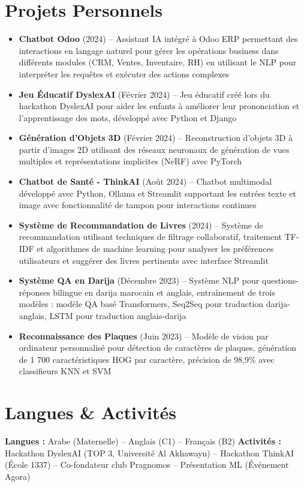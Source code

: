 \documentclass[10pt,a4paper]{article}
\begin{document}
\section*{Projets Personnels}
\begin{itemize}
    \item \textbf{Chatbot Odoo} (2024) -- Assistant IA intégré à Odoo ERP permettant des interactions en langage naturel pour gérer les opérations business dans différents modules (CRM, Ventes, Inventaire, RH) en utilisant le NLP pour interpréter les requêtes et exécuter des actions complexes
    \item \textbf{Jeu Éducatif DyslexAI} (Février 2024) -- Jeu éducatif créé lors du hackathon DyslexAI pour aider les enfants à améliorer leur prononciation et l'apprentissage des mots, développé avec Python et Django
    \item \textbf{Génération d'Objets 3D} (Février 2024) -- Reconstruction d'objets 3D à partir d'images 2D utilisant des réseaux neuronaux de génération de vues multiples et représentations implicites (NeRF) avec PyTorch
    \item \textbf{Chatbot de Santé - ThinkAI} (Août 2024) -- Chatbot multimodal développé avec Python, Ollama et Streamlit supportant les entrées texte et image avec fonctionnalité de tampon pour interactions continues
    \item \textbf{Système de Recommandation de Livres} (2024) -- Système de recommandation utilisant techniques de filtrage collaboratif, traitement TF-IDF et algorithmes de machine learning pour analyser les préférences utilisateurs et suggérer des livres pertinents avec interface Streamlit
    \item \textbf{Système QA en Darija} (Décembre 2023) -- Système NLP pour questions-réponses bilingue en darija marocain et anglais, entraînement de trois modèles : modèle QA basé Transformers, Seq2Seq pour traduction darija-anglais, LSTM pour traduction anglais-darija
    \item \textbf{Reconnaissance des Plaques} (Juin 2023) -- Modèle de vision par ordinateur personnalisé pour détection de caractères de plaques, génération de 1 700 caractéristiques HOG par caractère, précision de 98,9\% avec classifieurs KNN et SVM
\end{itemize}

\section*{Langues \& Activités}
\textbf{Langues :} Arabe (Maternelle) -- Anglais (C1) -- Français (B2) \quad
\textbf{Activités :} Hackathon DyslexAI (TOP 3, Université Al Akhawayn) -- Hackathon ThinkAI (École 1337) -- Co-fondateur club Pragnomos -- Présentation ML (Événement Agora)
\end{document}
